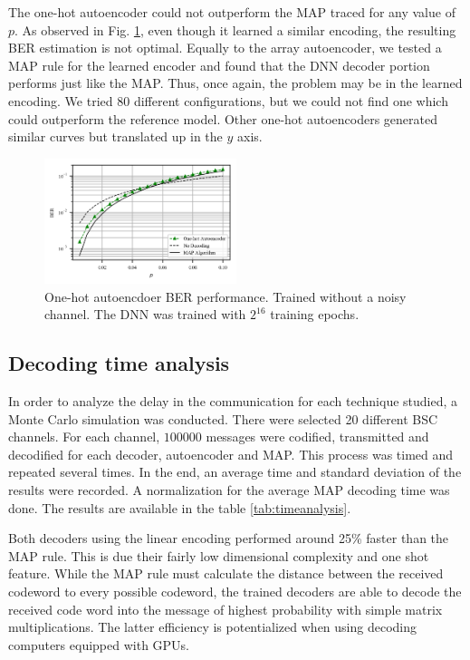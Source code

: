 \documentclass[conference]{IEEEtran}
\begin{document}
The one-hot autoencoder could not outperform the MAP traced for any value of $p$. As observed in Fig. \ref{fig:1Hautoencoder}, even though it learned a similar encoding, the resulting BER estimation is not optimal. Equally to the array autoencoder, we tested a MAP rule for the learned encoder and found that the DNN decoder portion performs just like the MAP. Thus, once again, the problem may be in the learned encoding. We tried 80 different configurations, but we could not find one which could outperform the reference model. Other one-hot autoencoders generated similar curves but translated up in the $y$ axis.


\begin{figure}[!ht]
  \centering
    \includegraphics[width=0.5\textwidth]{images/MAP_Autoencoder1H_Mep_131072_ptrain_0_192_128_96_64_32-128}
    \caption{One-hot autoencdoer BER performance. Trained without a noisy channel. The DNN was trained with $2^{16}$ training epochs.}\label{fig:1Hautoencoder}
\end{figure}

\subsection{Decoding time analysis}

In order to analyze the delay in the communication for each technique studied, a Monte Carlo simulation was conducted. There were selected 20 different BSC channels. For each channel, $100000$ messages were codified, transmitted and decodified for each decoder, autoencoder and MAP. This process was timed and repeated several times. In the end, an average time and standard deviation of the results were recorded. A normalization for the average MAP decoding time was done. The results are available in the table \ref{tab:timeanalysis}.  

Both decoders using the linear encoding performed around 25\% faster than the MAP rule. This is due their fairly low dimensional complexity and one shot feature. While the MAP rule must calculate the distance between the received codeword to every possible codeword, the trained decoders are able to decode the received code word into the message of highest probability with simple matrix multiplications. The latter efficiency is potentialized when using decoding computers equipped with GPUs.
\end{document}
